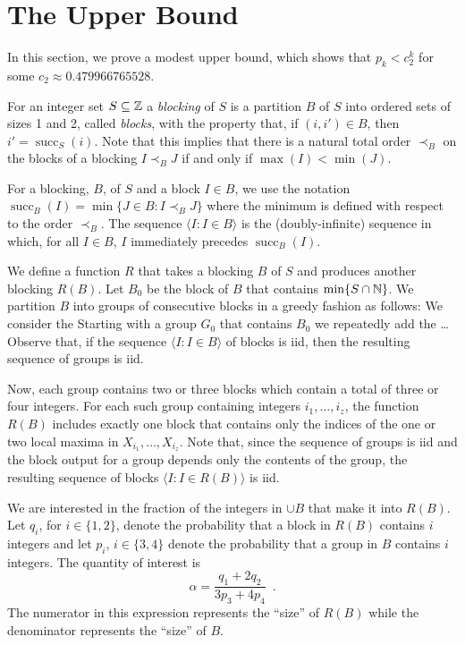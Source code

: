\documentclass{patmorin}
\DeclareMathOperator{\cw}{succ}
\begin{document}
\section{The Upper Bound}

In this section, we prove a modest upper bound, which shows that $p_k <
c_2^k$ for some $c_2\approx 0.479966765528$. 

For an integer set $S\subseteq\mathbb{Z}$ a \emph{blocking} of $S$ is a partition
$B$ of $S$ into ordered sets of sizes 1 and 2, called \emph{blocks},
with the property that, if $(i,i')\in B$, then $i'=\cw_S(i)$.  Note that
this implies that there is a natural total order $\prec_B$ on the
blocks of a blocking $I\prec_B J$ if and only if $\max(I)<\min(J)$.

For a blocking, $B$, of $S$ and a block $I\in B$, we use the notation
$\cw_B(I)=\min\{J\in B: I \prec_B J\}$ where the minimum is defined with
respect to the order $\prec_B$.  The sequence $\langle I: I\in B\rangle$ is the (doubly-infinite) sequence in which, for all $I\in B$, $I$ immediately precedes $\cw_B(I)$.

We define a function $R$ that takes a blocking $B$ of $S$ and produces
another blocking $R(B)$.  Let $B_0$ be the block of $B$ that contains
$\min\{S\cap \mathbb{N}\}$. We partition $B$ into groups of consecutive blocks
in a greedy fashion as follows:  We consider the Starting with a group
$G_0$ that contains $B_0$ we repeatedly add the \ldots Observe that, if the
sequence $\langle I:I\in B\rangle$ of blocks is iid, then the resulting
sequence of groups is iid.

Now, each group contains two or three blocks which contain a total
of three or four integers.  For each such group containing integers
$i_1,\ldots,i_z$, the function $R(B)$ includes exactly one block
that contains only the indices of the one or two local maxima in
$X_{i_1},\ldots,X_{i_z}$.  Note that, since the sequence of groups is iid
and the block output for a group depends only the contents of the group,
the resulting sequence of blocks $\langle I: I\in R(B)\rangle$ is iid.

We are interested in the fraction of the integers in $\cup B$
that make it into $R(B)$.  Let $q_i$, for $i\in\{1,2\}$, denote the
probability that a block in $R(B)$ contains $i$ integers and let $p_{i}$,
$i\in\{3,4\}$ denote the probability that a group in $B$ contains $i$
integers. The quantity of interest is
\[
    \alpha = \frac{q_1+2q_2}{3p_3 + 4p_4} \enspace .
\]
The numerator in this expression represents the ``size'' of $R(B)$
while the denominator represents the ``size'' of $B$.
\end{document}
